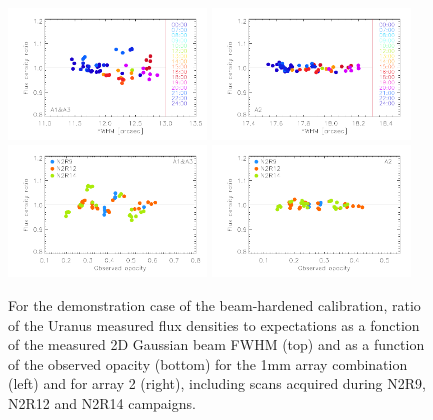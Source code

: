 \begin{figure}[ht!]
\begin{center}
\includegraphics[clip=true,width=0.47\textwidth]{Figures/Calibration/Photocorr/plot_flux_density_ratio_primaryphotocorr_demo_1mm.pdf}
\includegraphics[clip=true,width=0.47\textwidth]{Figures/Calibration/Photocorr/plot_flux_density_ratio_primaryphotocorr_demo_a2.pdf}
\includegraphics[clip=true,width=0.47\textwidth]{Figures/Calibration/Photocorr/plot_flux_density_ratio_obstau_primaryphotocorr_demo_1mm.pdf}
\includegraphics[clip=true,width=0.47\textwidth]{Figures/Calibration/Photocorr/plot_flux_density_ratio_obstau_primaryphotocorr_demo_a2.pdf}
\caption[Uranus flux density stability using the
  demonstration case of the beam-hardened calibration]{For the
  demonstration case of the beam-hardened calibration, 
  ratio of the Uranus measured flux densities to expectations as a
  fonction of the measured 2D Gaussian beam FWHM (top) and as a
  function of the observed opacity (bottom) for the 1mm array
  combination (left) and for array 2 (right),
  including scans acquired during N2R9, N2R12 and N2R14 campaigns. }
\label{fig:photocorr_demo_uranus_flux_fwhm}
\end{center}
\end{figure}



